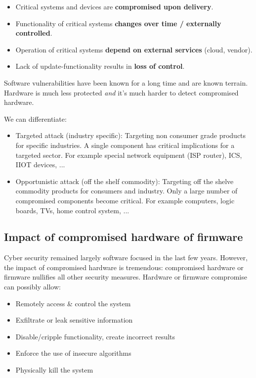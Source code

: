 \documentclass[11pt,oneside,a4paper]{article}
\begin{document}
\vspace{-\topsep}
\begin{itemize}
	\setlength{\itemsep}{0pt}
	\setlength{\parskip}{0pt}
	\item Critical systems and devices are \textbf{compromised upon delivery}.
	\item Functionality of critical systems \textbf{changes over time / externally controlled}.
	\item Operation of critical systems \textbf{depend on external services} (cloud, vendor).
	\item Lack of update-functionality results in \textbf{loss of control}.
\end{itemize}
\vspace{-\topsep}

\noindent Software vulnerabilities have been known for a long time and are known terrain. Hardware is much less protected \textit{and} it's much harder to detect compromised hardware.

\noindent We can differentiate:

\vspace{-\topsep}
\begin{itemize}
	\setlength{\itemsep}{0pt}
	\setlength{\parskip}{0pt}
	\item Targeted attack (industry specific): Targeting non consumer grade products for specific industries. A single component has critical implications for a targeted sector. For example special network equipment (ISP router), ICS, IIOT devices, ...
	\item Opportunistic attack (off the shelf commodity): Targeting off the shelve commodity products for consumers and industry. Only a large number of compromised components become critical. For example computers, logic boards, TVs, home control system, ...
\end{itemize}
\vspace{-\topsep}

\subsection{Impact of compromised hardware of firmware}

Cyber security remained largely software focused in the last few years. However, the impact of compromised hardware is tremendous: compromised hardware or firmware nullifies all other security measures. Hardware or firmware compromise can possibly allow:

\vspace{-\topsep}
\begin{itemize}
	\setlength{\itemsep}{0pt}
	\setlength{\parskip}{0pt}
	\item Remotely access \& control the system
	\item Exfiltrate or leak sensitive information
	\item Disable/cripple functionality, create incorrect results
	\item Enforce the use of insecure algorithms
	\item Physically kill the system
\end{itemize}
\vspace{-\topsep}
\end{document}
